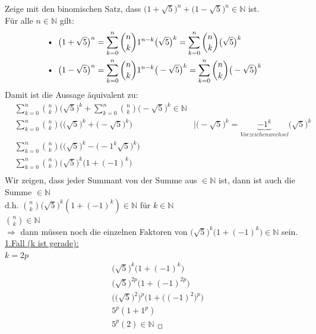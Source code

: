 Zeige mit den binomischen Satz, dass $ \big(1+\sqrt{5}\big)^n+\big(1-\sqrt{5}\big)^n \in\mathbb{N} $ ist.\vspace*{4mm} \\
Für alle $ n \in \mathbb{N} $ gilt:\\
\begin{align*}
	\text{\textbullet }\;\;\big(1+\sqrt{5}\big)^n&=\sum\limits_{k=0}^{n}\binom{n}{k}1^{n-k}\big(\sqrt{5}\big)^k=\sum\limits_{k=0}^{n}\binom{n}{k}\big(\sqrt{5}\big)^k\\
	\text{\textbullet }\;\;\big(1-\sqrt{5}\big)^n&=\sum\limits_{k=0}^{n}\binom{n}{k}1^{n-k}\big(-\sqrt{5}\big)^k=\sum\limits_{k=0}^{n}\binom{n}{k}\big(-\sqrt{5}\big)^k\\
\end{align*}
Damit ist die Aussage äquivalent zu:\\
\begin{align*}
	&\sum\limits_{k=0}^{n}\binom{n}{k}\big(\sqrt{5}\big)^k+\sum\limits_{k=0}^{n}\binom{n}{k}\big(-\sqrt{5}\big)^k \in \mathbb{N}\\
	&\sum\limits_{k=0}^{n}\binom{n}{k}\bigg(\big(\sqrt{5}\big)^k+\big(-\sqrt{5}\big)^k\bigg)& |\big(-\sqrt{5}\big)^k=\underbrace {-1^k}_{Vorzeichenwechsel}\big(\sqrt{5}\big)^k\\
	&\sum\limits_{k=0}^{n}\binom{n}{k}\bigg(\big(\sqrt{5}\big)^k-\big(-1^k\sqrt{5}\big)^k\bigg)\\
	&\sum\limits_{k=0}^{n}\binom{n}{k}\bigg(\sqrt{5}\big)^k(1+(-1)^k\bigg)\\
\end{align*}
Wir zeigen, dass jeder Summant von der Summe aus $\in \mathbb{N} $ ist, dann ist auch die Summe $\in \mathbb{N} $\\
d.h. $ \binom{n}{k}\big(\sqrt{5}\big)^k(1+(-1)^k) \in \mathbb{N}$ für $ k \in \mathbb{N} $\\
$ \binom{n}{k}  \in \mathbb{N}$\\$\Rightarrow$ dann müssen noch die einzelnen Faktoren von $ \big(\sqrt{5}\big)^k\big(1+(-1)^k\big) \in \mathbb{N}$ sein.\vspace*{2mm} \\
\underline{1.Fall (k ist gerade):}\\
$ k=2p $\\
\begin{align*}
	&\big(\sqrt{5}\big)^k\Big(1+(-1)^k\Big)\\
	&\big(\sqrt{5}\big)^{2p}\Big(1+(-1)^{2p}\Big)\\
	&\Big(\big(\sqrt{5}\big)^2\Big)^p\Big(1+\big((-1)^2 \big)^p\Big)\\
	&5^p(1+1^p)\\
	&5^p(2)\in \mathbb{N}_{\;\;\Square}
\end{align*}
